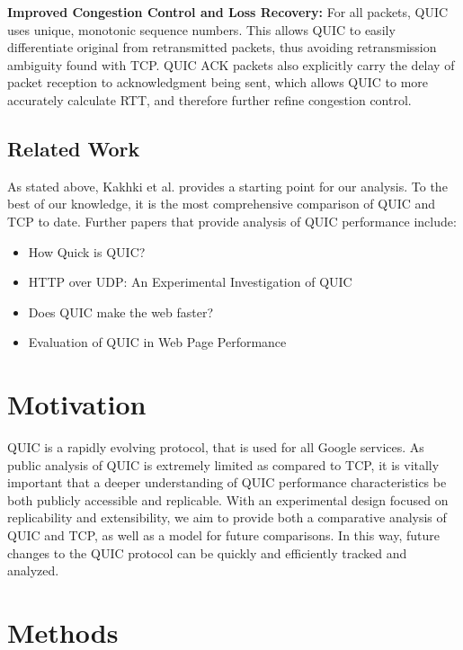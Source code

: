 \documentclass[12pt]{article}
\begin{document}
\textbf{Improved Congestion Control and Loss Recovery:} For all packets, QUIC uses unique, monotonic sequence numbers. This allows QUIC to easily differentiate original from retransmitted packets, thus avoiding retransmission ambiguity found with TCP. QUIC ACK packets also explicitly carry the delay of packet reception to acknowledgment being sent, which allows QUIC to more accurately calculate RTT, and therefore further refine congestion control\cite{quicLayout}.

\subsection{Related Work}
\label{background:related}
As stated above, Kakhki et al. provides a starting point for our analysis. To the best of our knowledge, it is the most comprehensive comparison of QUIC and TCP to date. Further papers that provide analysis of QUIC performance include:

\begin{itemize}
	\item How Quick is QUIC?
	\item HTTP over UDP: An Experimental Investigation of QUIC
	\item Does QUIC make the web faster?
	\item Evaluation of QUIC in Web Page Performance
\end{itemize}

\section{Motivation}
\label{motivation}
QUIC is a rapidly evolving protocol, that is used for all Google services. As public analysis of QUIC is extremely limited as compared to TCP, it is vitally important that a deeper understanding of QUIC performance characteristics be both publicly accessible and replicable. With an experimental design focused on replicability and extensibility, we aim to provide both a comparative analysis of QUIC and TCP, as well as a model for future comparisons. In this way, future changes to the QUIC protocol can be quickly and efficiently tracked and analyzed.

\section{Methods}
\label{methods}
\end{document}
